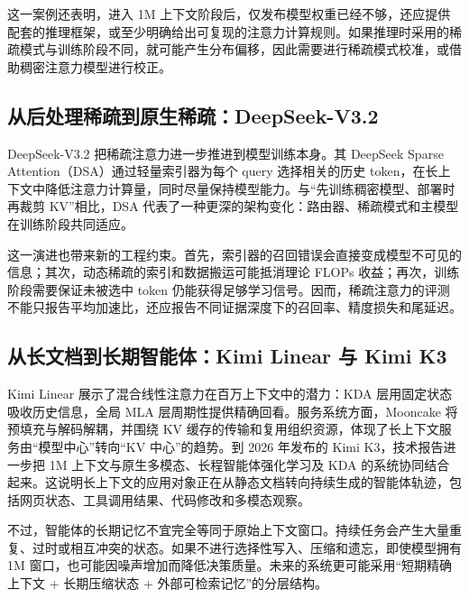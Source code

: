 \documentclass[UTF8,10pt,a4paper,fontset=none]{ctexart}
\begin{document}
这一案例还表明，进入 1M 上下文阶段后，仅发布模型权重已经不够，还应提供配套的推理框架，或至少明确给出可复现的注意力计算规则。如果推理时采用的稀疏模式与训练阶段不同，就可能产生分布偏移，因此需要进行稀疏模式校准，或借助稠密注意力模型进行校正。

\subsection{从后处理稀疏到原生稀疏：DeepSeek-V3.2}
DeepSeek-V3.2 把稀疏注意力进一步推进到模型训练本身。其 DeepSeek Sparse Attention（DSA）通过轻量索引器为每个 query 选择相关的历史 token，在长上下文中降低注意力计算量，同时尽量保持模型能力\cite{deepseekv32}。与“先训练稠密模型、部署时再裁剪 KV”相比，DSA 代表了一种更深的架构变化：路由器、稀疏模式和主模型在训练阶段共同适应。

这一演进也带来新的工程约束。首先，索引器的召回错误会直接变成模型不可见的信息；其次，动态稀疏的索引和数据搬运可能抵消理论 FLOPs 收益；再次，训练阶段需要保证未被选中 token 仍能获得足够学习信号。因而，稀疏注意力的评测不能只报告平均加速比，还应报告不同证据深度下的召回率、精度损失和尾延迟。

\subsection{从长文档到长期智能体：Kimi Linear 与 Kimi K3}
Kimi Linear 展示了混合线性注意力在百万上下文中的潜力：KDA 层用固定状态吸收历史信息，全局 MLA 层周期性提供精确回看\cite{kimiLinear}。服务系统方面，Mooncake 将预填充与解码解耦，并围绕 KV 缓存的传输和复用组织资源，体现了长上下文服务由“模型中心”转向“KV 中心”的趋势\cite{qin2024moonlight}。到 2026 年发布的 Kimi K3，技术报告进一步把 1M 上下文与原生多模态、长程智能体强化学习及 KDA 的系统协同结合起来\cite{kimiK3}。这说明长上下文的应用对象正在从静态文档转向持续生成的智能体轨迹，包括网页状态、工具调用结果、代码修改和多模态观察。

不过，智能体的长期记忆不宜完全等同于原始上下文窗口。持续任务会产生大量重复、过时或相互冲突的状态。如果不进行选择性写入、压缩和遗忘，即使模型拥有 1M 窗口，也可能因噪声增加而降低决策质量。未来的系统更可能采用“短期精确上下文 + 长期压缩状态 + 外部可检索记忆”的分层结构。
\end{document}
